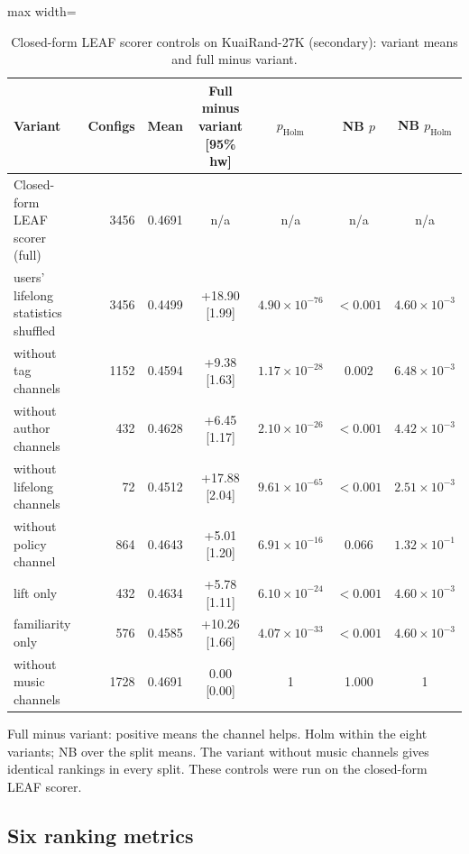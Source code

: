 \documentclass[preprint,12pt,authoryear]{elsarticle}
\begin{document}
\begin{table}[tbp]
\centering
\footnotesize
\caption{Closed-form LEAF scorer controls on KuaiRand-27K (secondary): variant means and full minus variant.}
\label{tab:leafctl}
\begin{adjustbox}{max width=\linewidth}
\begin{tabular}{lrccccc}
\toprule
Variant & Configs & Mean & Full minus variant [95\% hw] & $p_{\mathrm{Holm}}$ & NB $p$ & NB $p_{\mathrm{Holm}}$ \\
\midrule
Closed-form LEAF scorer (full) & 3456 & 0.4691 & n/a & n/a & n/a & n/a \\
\midrule
users' lifelong statistics shuffled & 3456 & 0.4499 & +18.90 [1.99] & $4.90\times10^{-76}$ & $<0.001$ & $4.60\times10^{-3}$ \\
without tag channels & 1152 & 0.4594 & +9.38 [1.63] & $1.17\times10^{-28}$ & 0.002 & $6.48\times10^{-3}$ \\
without author channels & 432 & 0.4628 & +6.45 [1.17] & $2.10\times10^{-26}$ & $<0.001$ & $4.42\times10^{-3}$ \\
without lifelong channels & 72 & 0.4512 & +17.88 [2.04] & $9.61\times10^{-65}$ & $<0.001$ & $2.51\times10^{-3}$ \\
without policy channel & 864 & 0.4643 & +5.01 [1.20] & $6.91\times10^{-16}$ & 0.066 & $1.32\times10^{-1}$ \\
lift only & 432 & 0.4634 & +5.78 [1.11] & $6.10\times10^{-24}$ & $<0.001$ & $4.60\times10^{-3}$ \\
familiarity only & 576 & 0.4585 & +10.26 [1.66] & $4.07\times10^{-33}$ & $<0.001$ & $4.60\times10^{-3}$ \\
without music channels & 1728 & 0.4691 & 0.00 [0.00] & 1 & 1.000 & 1 \\
\bottomrule
\end{tabular}
\end{adjustbox}
\par\smallskip
\begin{minipage}{\linewidth}\raggedright\footnotesize Full minus variant: positive means the channel helps. Holm within the eight variants; NB over the split means. The variant without music channels gives identical rankings in every split. These controls were run on the closed-form LEAF scorer.\end{minipage}
\end{table}


\subsection{Six ranking metrics}\label{app:metrics}
\end{document}
